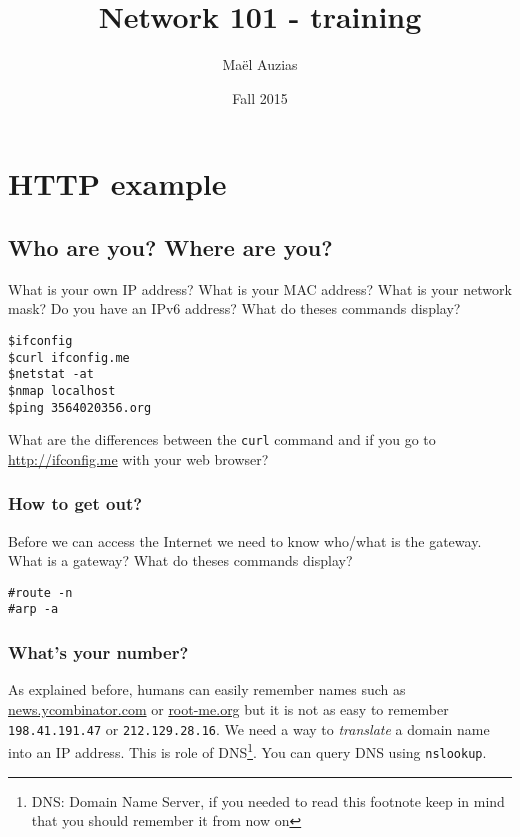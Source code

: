 \documentclass[11pt]{article}
\begin{document}
\title{Network 101 - training}
\date{Fall 2015}
\author{Maël Auzias}
\maketitle

\tableofcontents
\pagebreak


\section{HTTP example}
\subsection{Who are you? Where are you?}
What is your own IP address? What is your MAC address? What is your network mask? Do you have an IPv6 address?
What do theses commands display?
\begin{verbatim}
$ifconfig
$curl ifconfig.me
$netstat -at
$nmap localhost
$ping 3564020356.org
\end{verbatim}
What are the differences between the \verb"curl" command and if you go to \color{blue}\href{http://ifconfig.me}{http://ifconfig.me}\color{black} with your web browser?

\subsubsection{How to get out?}
Before we can access the Internet we need to know who/what is the gateway. What is a gateway?
What do theses commands display?
\begin{verbatim}
#route -n
#arp -a
\end{verbatim}

\subsubsection{What's your number?}
As explained before, humans can easily remember names such as \color{blue}\href{https://news.ycombinator.com}{news.ycombinator.com}\color{black} or \color{blue}\href{http://root-me.org}{root-me.org}\color{black} but it is not as easy to remember \verb"198.41.191.47" or \verb"212.129.28.16". We need a way to \emph{translate} a domain name into an IP address. This is role of DNS\footnote{DNS: Domain Name Server, if you needed to read this footnote keep in mind that you should remember it from now on}. You can query DNS using \verb"nslookup".
\end{document}
